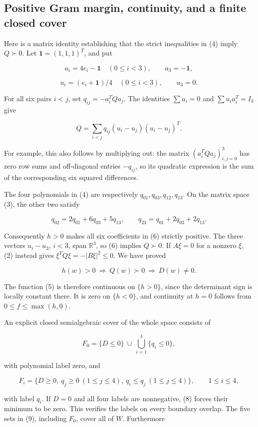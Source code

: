 \documentclass[11pt]{article}
\begin{document}
\subsection{Positive Gram margin, continuity, and a finite closed cover}

Here is a matrix identity establishing that the strict inequalities in (4)
imply \(Q\succ0\). Let \(\mathbf1=(1,1,1)^T\), and put

\[
a_i=4e_i-\mathbf1\quad(0\le i<3),\qquad a_3=-\mathbf1,
\]

\[
u_i=(e_i+\mathbf1)/4\quad(0\le i<3),\qquad u_3=0.
\]

For all six pairs \(i<j\), set \(q_{ij}=-a_i^TQa_j\). The identities
\(\sum a_i=0\) and \(\sum u_i a_i^T=I_3\) give

\[
Q=\sum_{i<j}q_{ij}(u_i-u_j)(u_i-u_j)^T.
\tag{6}
\]

For example, this also follows by multiplying out: the matrix
\((a_i^TQa_j)_{i,j=0}^3\) has zero row sums and off-diagonal entries
\(-q_{ij}\), so its quadratic expression is the sum of the corresponding
six squared differences.

The four polynomials in (4) are respectively
\(q_{01},q_{03},q_{12},q_{13}\). On the matrix space (3), the other two satisfy

\[
q_{02}=2q_{01}+6q_{03}+5q_{13},\qquad
q_{23}=q_{01}+2q_{03}+2q_{13}.
\tag{7}
\]

Consequently \(h>0\) makes all six coefficients in (6) strictly positive.
The three vectors \(u_i-u_3\), \(i<3\), span \(\mathbb R^3\), so (6)
implies \(Q\succ0\). If \(A\xi=0\) for a nonzero \(\xi\), (2) instead
gives \(\xi^TQ\xi=-|B\xi|^2\le0\). We have proved

\[
h(w)>0\ \Longrightarrow\ Q(w)\succ0\ \Longrightarrow\ D(w)\ne0.
\tag{8}
\]

The function (5) is therefore continuous on \(\{h>0\}\), since the
determinant sign is locally constant there. It is zero on \(\{h<0\}\), and
continuity at \(h=0\) follows from \(0\le f\le\max(h,0)\).

An explicit closed semialgebraic cover of the whole space consists of

\[
F_0=\{D\le0\}\ \cup\ \bigcup_{i=1}^4\{q_i\le0\},
\]

with polynomial label zero, and

\[
F_i=\{D\ge0,\ q_j\ge0\ (1\le j\le4),\ q_i\le q_j\ (1\le j\le4)\},
\qquad1\le i\le4,
\tag{9}
\]

with label \(q_i\). If \(D=0\) and all four labels are nonnegative, (8)
forces their minimum to be zero. This verifies the labels on every boundary
overlap. The five sets in (9), including \(F_0\), cover all of \(W\).
Furthermore
\end{document}
